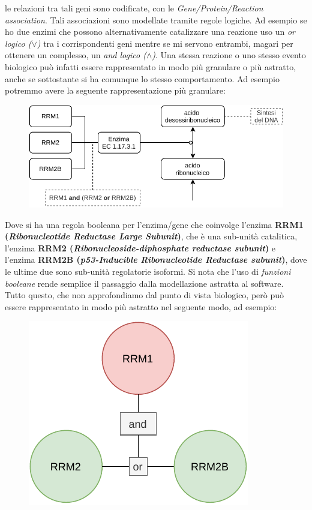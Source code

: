 \documentclass[a4paper,12pt, oneside]{book}
\begin{document}
le relazioni tra tali geni sono codificate, con le \textit{Gene/Protein/Reaction
association}. Tali associazioni sono modellate tramite regole logiche. Ad
esempio se ho due enzimi che possono alternativamente catalizzare una reazione 
uso un \textit{or logico ($\lor$)} tra i corrispondenti geni mentre se mi servono entrambi, magari per
ottenere un complesso, un \textit{and
  logico ($\land$)}.  Una
stessa reazione o uno 
stesso evento biologico può infatti essere rappresentato in modo più granulare o
più astratto, anche se sottostante si ha comunque lo stesso comportamento.
Ad esempio potremmo avere la seguente rappresentazione più granulare:
\begin{figure}[H]
  \centering
  \includegraphics[scale = 0.8]{img/ab.pdf}
\end{figure}
Dove si ha una regola booleana per l'enzima/gene che coinvolge l'enzima
\textbf{RRM1 (\textit{Ribonucleotide Reductase Large Subunit})}, che è una
sub-unità catalitica, l'enzima \textbf{RRM2 (\textit{Ribonucleoside-diphosphate
    reductase subunit})} e l'enzima \textbf{RRM2B (\textit{p53-Inducible
    Ribonucleotide Reductase subunit})}, dove le ultime due sono sub-unità
regolatorie isoformi. Si nota che l'uso di \textit{funzioni booleane} rende
semplice il passaggio dalla modellazione astratta al software.\\
Tutto questo, che non approfondiamo dal punto di vista biologico, però può
essere rappresentato in modo più astratto nel seguente modo, ad esempio:
\begin{figure}[H]
  \centering
  \includegraphics[scale = 0.8]{img/ab2.pdf}
\end{figure}
\end{document}
